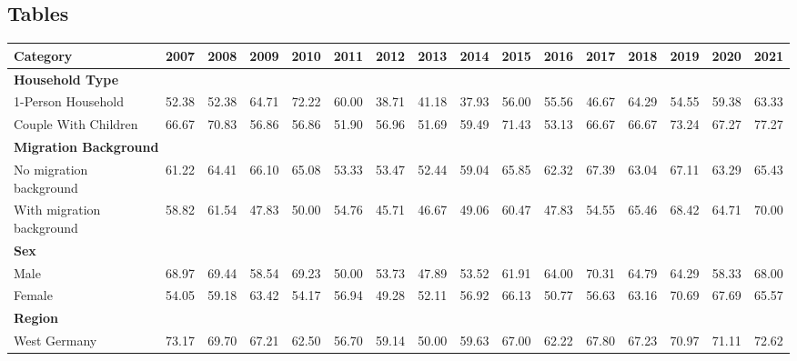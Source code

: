 
\renewcommand{\thetable}{\thesection \arabic{table}}
\setcounter{table}{0}

\begin{landscape}
\renewcommand{\arraystretch}{0.8}
\section{Tables} \label{appendix:tables}

\begin{table}[H]
\setlength{\tabcolsep}{4pt} %
\small
\centering
\begin{tabular}{lccccccccccccccc}
\toprule
Category & 2007 & 2008 & 2009 & 2010 & 2011 & 2012 & 2013 & 2014 & 2015 & 2016 & 2017 & 2018 & 2019 & 2020 & 2021 \\
\midrule
\multicolumn{16}{l}{\textbf{Household Type}} \\
1-Person Household      & 52.38 & 52.38 & 64.71 & 72.22 & 60.00 & 38.71 & 41.18 & 37.93 & 56.00 & 55.56 & 46.67 & 64.29 & 54.55 & 59.38 & 63.33 \\
Couple With Children    & 66.67 & 70.83 & 56.86 & 56.86 & 51.90 & 56.96 & 51.69 & 59.49 & 71.43 & 53.13 & 66.67 & 66.67 & 73.24 & 67.27 & 77.27 \\
\midrule
\multicolumn{16}{l}{\textbf{Migration Background}} \\
No migration background   & 61.22 & 64.41 & 66.10 & 65.08 & 53.33 & 53.47 & 52.44 & 59.04 & 65.85 & 62.32 & 67.39 & 63.04 & 67.11 & 63.29 & 65.43 \\
With migration background & 58.82 & 61.54 & 47.83 & 50.00 & 54.76 & 45.71 & 46.67 & 49.06 & 60.47 & 47.83 & 54.55 & 65.46 & 68.42 & 64.71 & 70.00 \\
\midrule
\multicolumn{16}{l}{\textbf{Sex}} \\
Male   & 68.97 & 69.44 & 58.54 & 69.23 & 50.00 & 53.73 & 47.89 & 53.52 & 61.91 & 64.00 & 70.31 & 64.79 & 64.29 & 58.33 & 68.00 \\
Female & 54.05 & 59.18 & 63.42 & 54.17 & 56.94 & 49.28 & 52.11 & 56.92 & 66.13 & 50.77 & 56.63 & 63.16 & 70.69 & 67.69 & 65.57 \\
\midrule
\multicolumn{16}{l}{\textbf{Region}} \\
West Germany & 73.17 & 69.70 & 67.21 & 62.50 & 56.70 & 59.14 & 50.00 & 59.63 & 67.00 & 62.22 & 67.80 & 67.23 & 70.97 & 71.11 & 72.62 \\

\end{tabular}
\end{table}
\end{landscape}
